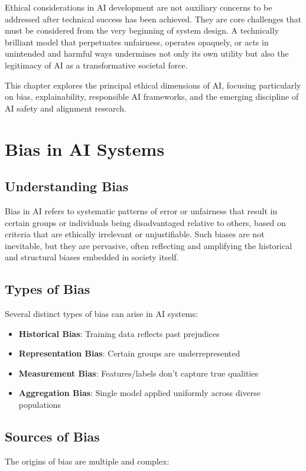 \documentclass[openany]{book}
\begin{document}
Ethical considerations in AI development are not auxiliary concerns to be 
addressed after technical success has been achieved. They are core challenges 
that must be considered from the very beginning of system design. A technically 
brilliant model that perpetuates unfairness, operates opaquely, or acts in 
unintended and harmful ways undermines not only its own utility but also the 
legitimacy of AI as a transformative societal force.

This chapter explores the principal ethical dimensions of AI, focusing 
particularly on bias, explainability, responsible AI frameworks, and the 
emerging discipline of AI safety and alignment research.

\section{Bias in AI Systems}

\subsection{Understanding Bias}
Bias in AI refers to systematic patterns of error or unfairness that result in 
certain groups or individuals being disadvantaged relative to others, based on 
criteria that are ethically irrelevant or unjustifiable. Such biases are not 
inevitable, but they are pervasive, often reflecting and amplifying the 
historical and structural biases embedded in society itself.

\subsection{Types of Bias}
Several distinct types of bias can arise in AI systems:

\begin{itemize}
    \item \textbf{Historical Bias}: Training data reflects past prejudices
    \item \textbf{Representation Bias}: Certain groups are underrepresented
    \item \textbf{Measurement Bias}: Features/labels don't capture true 
    qualities
    \item \textbf{Aggregation Bias}: Single model applied uniformly across 
    diverse populations
\end{itemize}

\subsection{Sources of Bias}
The origins of bias are multiple and complex:
\end{document}
